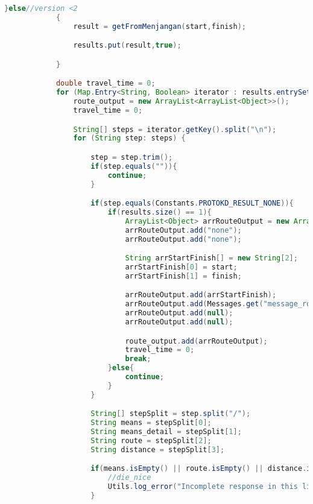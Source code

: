 \begin{lstlisting}[language=Java,basicstyle=\tiny,caption=Application.java]
            }else//version <2
            {
                result = getFromMenjangan(start,finish);

                results.put(result,true);

            }

            double travel_time = 0;
            for (Map.Entry<String, Boolean> iterator : results.entrySet()) {
                route_output = new ArrayList<ArrayList<Object>>();
                travel_time = 0;

                String[] steps = iterator.getKey().split("\n");
                for (String step: steps) {

                    step = step.trim();
                    if(step.equals("")){
                        continue;
                    }

                    if(step.equals(Constants.PROTOKD_RESULT_NONE)){
                        if(results.size() == 1){
                            ArrayList<Object> arrRouteOutput = new ArrayList<Object>();
                            arrRouteOutput.add("none");
                            arrRouteOutput.add("none");

                            String arrStartFinish[] = new String[2];
                            arrStartFinish[0] = start;
                            arrStartFinish[1] = finish;

                            arrRouteOutput.add(arrStartFinish);
                            arrRouteOutput.add(Messages.get("message_routenotfound_"+ presentation));
                            arrRouteOutput.add(null);
                            arrRouteOutput.add(null);

                            route_output.add(arrRouteOutput);
                            travel_time = 0;
                            break;
                        }else{
                            continue;
                        }
                    }

                    String[] stepSplit = step.split("/");
                    String means = stepSplit[0];
                    String means_detail = stepSplit[1];
                    String route = stepSplit[2];
                    String distance = stepSplit[3];

                    if(means.isEmpty() || route.isEmpty() || distance.isEmpty()){
                        //die_nice
                        Utils.log_error("Incomplete response in this line: ");
                    }


\end{lstlisting}
